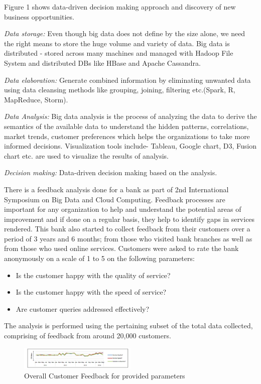 \documentclass[sigconf]{acmart}
\begin{document}
Figure 1 shows data-driven decision making approach and discovery of new business opportunities.

\textit{Data storage:} Even though big data does not define by the size alone, we need the right means to store the huge volume and variety of data. Big data is distributed - stored across many machines and managed with Hadoop File System and distributed DBs like HBase and Apache Cassandra\cite{Big-data-storage}.

\textit{Data elaboration:} Generate combined information by eliminating unwanted data using data cleansing methods like grouping, joining, filtering etc.(Spark, R, MapReduce, Storm). 

\textit{Data Analysis:} Big data analysis is the process of analyzing the data to derive the semantics of the available data to understand the hidden patterns, correlations, market trends, customer preferences which helps the organizations to take more informed decisions. Visualization tools include- Tableau, Google chart, D3, Fusion chart etc. are used to visualize the results of analysis.

\textit{Decision making:} Data-driven decision making based on the analysis.
 
 There is a feedback analysis done for a bank as part of 2nd International Symposium on Big Data and Cloud Computing. Feedback processes are important for any organization to help and understand the potential areas of improvement and if done on a regular basis, they help to identify gaps in services rendered. This bank also started to collect feedback from their customers over a period of 3 years and 6 months; from those who visited bank branches as well as from those who used online services. Customers were asked to rate the bank anonymously on a scale of 1 to 5 on the following parameters: 
 
\begin{itemize}
   \item Is the customer happy with the quality of service?
   \item Is the customer happy with the speed of service?
   \item Are customer queries addressed effectively?
\end{itemize}

The analysis is performed using the pertaining subset of the total data collected, comprising of feedback from around 20,000 customers\cite{bigdata-banking}. 

\begin{figure}
  \centering
  \includegraphics[width=0.5\textwidth]{images/Figure2.png}
  \caption{Overall Customer Feedback for provided parameters 
  \cite{bigdata-banking}}
  \label{fig:Figure2} 
\end{figure}
\end{document}
